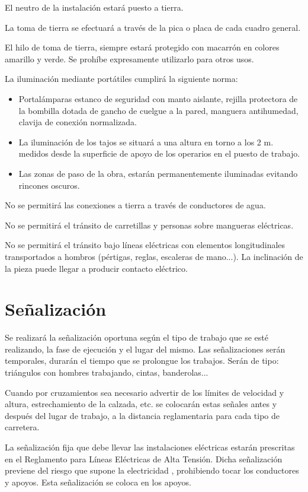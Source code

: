 El neutro de la instalación estará puesto a tierra.

La toma de tierra se efectuará a través de la pica o placa de cada cuadro general.

El hilo de toma de tierra, siempre estará protegido con macarrón en colores amarillo y verde. Se prohíbe expresamente utilizarlo para otros usos.

La iluminación mediante portátiles cumplirá la siguiente norma:
\begin{itemize}[label=--]
    \item Portalámparas estanco de seguridad con manto aislante, rejilla protectora de la bombilla dotada de gancho de cuelgue a la pared, manguera antihumedad, clavija de conexión normalizada.
    \item La iluminación de los tajos se situará a una altura en torno a los 2 m. medidos desde la superficie de apoyo de los operarios en el puesto de trabajo.
    \item Las zonas de paso de la obra, estarán permanentemente iluminadas evitando rincones oscuros.  
\end{itemize}
No se permitirá las conexiones a tierra a través de conductores de agua.
	
No se permitirá el tránsito de carretillas y personas sobre mangueras eléctricas.

No se permitirá el tránsito bajo líneas eléctricas con elementos longitudinales transportados a hombros (pértigas, reglas, escaleras de mano...). La inclinación de la pieza puede llegar a producir contacto eléctrico.
\section{Señalización}
\label{sec:sys-señalizacion}
Se realizará la señalización oportuna según el tipo de trabajo que se esté realizando, la fase de ejecución y el lugar del mismo. Las señalizaciones serán temporales, durarán el tiempo que se prolongue los trabajos. Serán de tipo: triángulos con hombres trabajando, cintas, banderolas...

Cuando por cruzamientos sea necesario advertir de los límites de velocidad y altura, estrechamiento de la calzada, etc. se colocarán estas señales antes y después del lugar de trabajo, a la distancia reglamentaria para cada tipo de carretera.

La señalización fija que debe llevar las instalaciones eléctricas estarán prescritas en el Reglamento para Líneas Eléctricas de Alta Tensión. Dicha señalización previene del riesgo que supone la electricidad , prohibiendo tocar los conductores y apoyos. Esta señalización se coloca en los apoyos.
